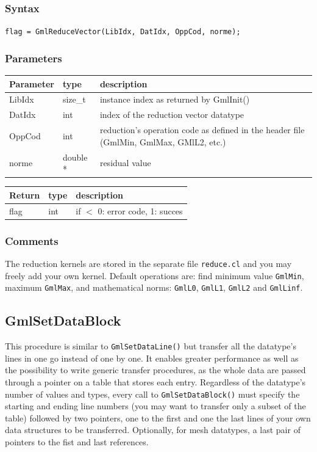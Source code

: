 \documentclass[a4paper,12pt]{article}
\begin{document}
\subsubsection*{Syntax}
{\tt flag = GmlReduceVector(LibIdx, DatIdx, OppCod, norme);}

\subsubsection*{Parameters}
\begin{tabular}{|m{2cm}|m{1.5cm}|m{10.5cm}|}
\hline
Parameter  & type     & description \\
\hline
LibIdx     & size\_t  & instance index as returned by GmlInit() \\
\hline
DatIdx     & int      & index of the reduction vector datatype  \\
\hline
OppCod     & int      & reduction's operation code as defined in the header file (GmlMin, GmlMax, GMlL2, etc.) \\
\hline
norme      & double * & residual value \\
\hline
\end{tabular}

\medskip

\begin{tabular}{|m{2cm}|m{1.5cm}|m{10.5cm}|}
\hline
Return     & type   & description \\
\hline
flag       & int    & if $<$ 0: error code, 1: succes  \\
\hline
\end{tabular}

\subsubsection*{Comments}
The reduction kernels are stored in the separate file {\tt reduce.cl} and you may freely add your own kernel. Default operations are: find minimum value {\tt GmlMin}, maximum {\tt GmlMax}, and mathematical norms: {\tt GmlL0}, {\tt GmlL1}, {\tt GmlL2} and {\tt GmlLinf}.


\subsection{GmlSetDataBlock}
This procedure is similar to {\tt GmlSetDataLine()} but transfer all the datatype's lines in one go instead of one by one. It enables greater performance as well as the possibility to write generic transfer procedures, as the whole data are passed through a pointer on a table that stores each entry. Regardless of the datatype's number of values and types, every call to {\tt GmlSetDataBlock()} must specify the starting and ending line numbers (you may want to transfer only a subset of the table) followed by two pointers, one to the first and one the last lines of your own data structures to be transferred. Optionally, for mesh datatypes, a last pair of pointers to the fist and last references.
\end{document}
